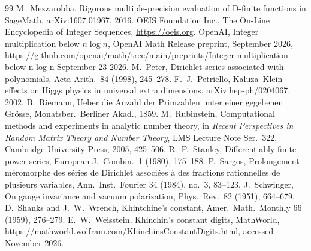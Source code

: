 \documentclass[11pt,reqno]{amsart}
\theoremstyle{definition}
\theoremstyle{remark}
\begin{document}
\begin{thebibliography}{99}
 M.~Mezzarobba, Rigorous multiple-precision evaluation of D-finite functions in SageMath, arXiv:1607.01967, 2016.
 OEIS Foundation Inc., The On-Line Encyclopedia of Integer Sequences, \url{https://oeis.org}.
 OpenAI, Integer multiplication below $n\log n$, OpenAI Math Release preprint, September 2026,
\url{https://github.com/openai/math/tree/main/preprints/Integer-multiplication-below-n-log-n-September-23-2026}.
 M.~Peter, Dirichlet series associated with polynomials, Acta Arith.\ 84 (1998), 245--278.
 F.~J.~Petriello, Kaluza--Klein effects on Higgs physics in universal extra dimensions, arXiv:hep-ph/0204067, 2002.
 B.~Riemann, Ueber die Anzahl der Primzahlen unter einer gegebenen Gr\"osse, Monatsber.\ Berliner Akad., 1859.
 M.~Rubinstein, Computational methods and experiments in analytic number theory, in \emph{Recent Perspectives in Random Matrix Theory and Number Theory}, LMS Lecture Note Ser.\ 322, Cambridge University Press, 2005, 425--506.
 R.~P.~Stanley, Differentiably finite power series, European J.\ Combin.\ 1 (1980), 175--188.
 P.~Sargos, Prolongement m\'eromorphe des s\'eries de Dirichlet associ\'ees \`a des fractions rationnelles de plusieurs variables, Ann.\ Inst.\ Fourier 34 (1984), no.~3, 83--123.
 J.~Schwinger, On gauge invariance and vacuum polarization, Phys.\ Rev.\ 82 (1951), 664--679.
 D.~Shanks and J.~W.~Wrench, Khintchine's constant, Amer.\ Math.\ Monthly 66 (1959), 276--279.
 E.~W.~Weisstein, Khinchin's constant digits, MathWorld, \url{https://mathworld.wolfram.com/KhinchinsConstantDigits.html}, accessed November 2026.
\end{thebibliography}
\end{document}
